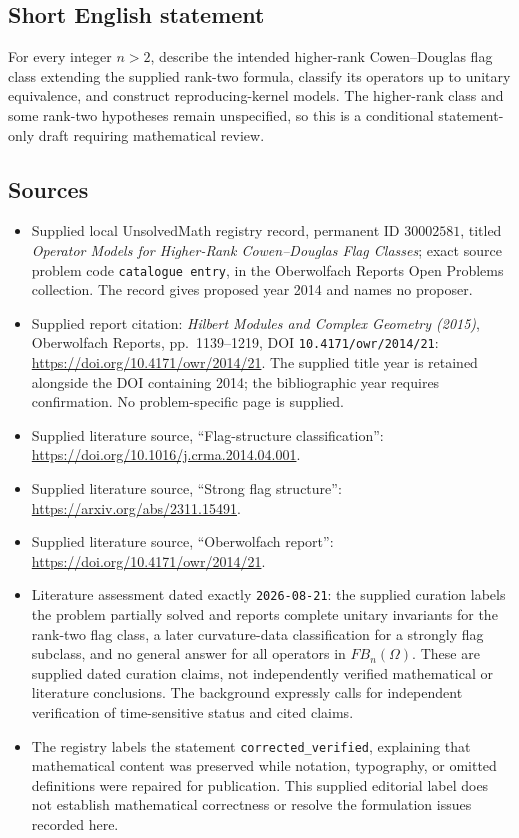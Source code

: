 \documentclass[11pt]{article}
\begin{document}
\subsection{Short English statement}
For every integer \(n>2\), describe the intended higher-rank Cowen--Douglas flag class extending the supplied rank-two formula, classify its operators up to unitary equivalence, and construct reproducing-kernel models. The higher-rank class and some rank-two hypotheses remain unspecified, so this is a conditional statement-only draft requiring mathematical review.
\subsection{Sources}
\begin{itemize}
\item Supplied local UnsolvedMath registry record, permanent ID \(30002581\), titled \emph{Operator Models for Higher-Rank Cowen--Douglas Flag Classes}; exact source problem code \texttt{catalogue entry}, in the Oberwolfach Reports Open Problems collection. The record gives proposed year 2014 and names no proposer.
\item Supplied report citation: \emph{Hilbert Modules and Complex Geometry (2015)}, Oberwolfach Reports, pp.~1139--1219, DOI \texttt{10.4171/owr/2014/21}: \url{https://doi.org/10.4171/owr/2014/21}. The supplied title year is retained alongside the DOI containing 2014; the bibliographic year requires confirmation. No problem-specific page is supplied.
\item Supplied literature source, ``Flag-structure classification'': \url{https://doi.org/10.1016/j.crma.2014.04.001}.
\item Supplied literature source, ``Strong flag structure'': \url{https://arxiv.org/abs/2311.15491}.
\item Supplied literature source, ``Oberwolfach report'': \url{https://doi.org/10.4171/owr/2014/21}.
\item Literature assessment dated exactly \texttt{2026-08-21}: the supplied curation labels the problem partially solved and reports complete unitary invariants for the rank-two flag class, a later curvature-data classification for a strongly flag subclass, and no general answer for all operators in \(FB_n(\Omega)\). These are supplied dated curation claims, not independently verified mathematical or literature conclusions. The background expressly calls for independent verification of time-sensitive status and cited claims.
\item The registry labels the statement \texttt{corrected\_verified}, explaining that mathematical content was preserved while notation, typography, or omitted definitions were repaired for publication. This supplied editorial label does not establish mathematical correctness or resolve the formulation issues recorded here.
\end{itemize}
\end{document}
